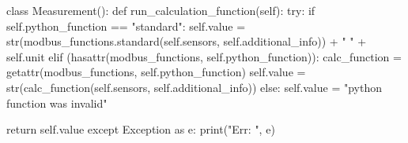 \begin{pythoncode}
class Measurement():
	def run_calculation_function(self):
		try:
			if self.python_function == "standard":
				self.value = str(modbus_functions.standard(self.sensors, self.additional_info)) + " " + self.unit
			elif (hasattr(modbus_functions, self.python_function)):
				calc_function = getattr(modbus_functions, self.python_function)
				self.value = str(calc_function(self.sensors, self.additional_info))
			else:
				self.value = "python function was invalid"
		
			return self.value
		except Exception as e:
			print("Err: ", e)
\end{pythoncode}
